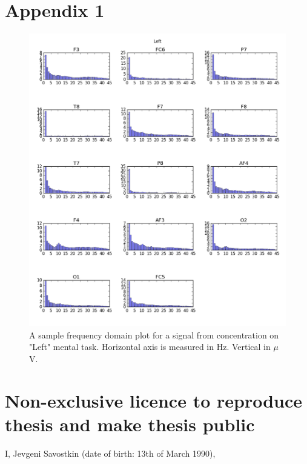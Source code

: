 \documentclass[12pt]{article}
\theoremstyle{definition}
\begin{document}
\section{Appendix 1}
\label{}
\begin{figure} [H]
\begin{center}
\includegraphics[width=1\textwidth]{left_amplitudes}
\caption{A sample frequency domain plot for a signal from concentration on "Left" mental task. Horizontal axis is measured in Hz. Vertical in $\mu$V.}
\end{center}
\end{figure}

\pagebreak
\section*{\small Non-exclusive licence to reproduce thesis and make thesis public}


I, Jevgeni Savostkin (date of birth: 13th of March 1990),
\end{document}
